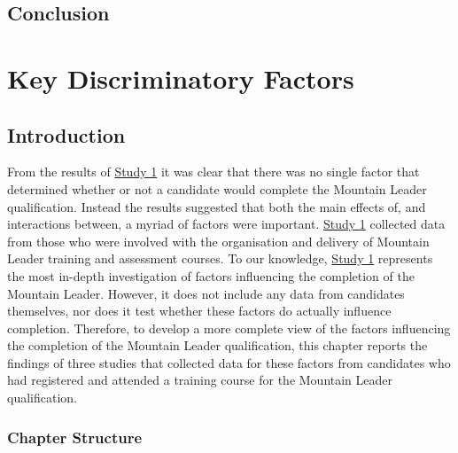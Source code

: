 \documentclass[
  12pt,
  a4paper,
]{book}
\begin{document}
\hypertarget{qual-conclusion}{%
\section{Conclusion}\label{qual-conclusion}}

\hypertarget{ml-pra}{%
\chapter{Key Discriminatory Factors}\label{ml-pra}}

\hypertarget{pra-introduction}{%
\section{Introduction}\label{pra-introduction}}

From the results of \protect\hyperlink{ml-qualitative}{Study 1} it was clear that there was no single factor that determined whether or not a candidate would complete the Mountain Leader qualification. Instead the results suggested that both the main effects of, and interactions between, a myriad of factors were important. \protect\hyperlink{ml-qualitative}{Study 1} collected data from those who were involved with the organisation and delivery of Mountain Leader training and assessment courses. To our knowledge, \protect\hyperlink{ml-qualitative}{Study 1} represents the most in-depth investigation of factors influencing the completion of the Mountain Leader. However, it does not include any data from candidates themselves, nor does it test whether these factors do actually influence completion. Therefore, to develop a more complete view of the factors influencing the completion of the Mountain Leader qualification, this chapter reports the findings of three studies that collected data for these factors from candidates who had registered and attended a training course for the Mountain Leader qualification.

\hypertarget{pra-chapter-structure}{%
\subsection{Chapter Structure}\label{pra-chapter-structure}}
\end{document}
